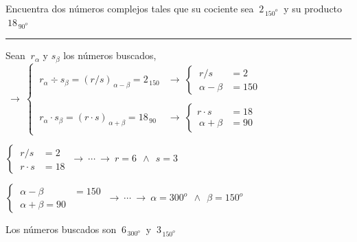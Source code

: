 \begin{miejercicio}

Encuentra dos números complejos tales que su cociente sea $\ 2_{\, 150^o} \ $ y su producto $\ 18_{\, 90^o}$

\rule{250pt}{0.5pt}

\vspace{2mm} Sean $\ r_\alpha$ y $s_\beta$ los números buscados,
$\ \to \ \begin{cases}
\ r_\alpha \div s_\beta=(r/s)_{\, \alpha-\beta}= 2_{\, 150}  
&\to \ \begin{cases} \ r/s&=2 \\ \ \alpha-\beta&=150   \end{cases}
\\ \\
\ r_\alpha \cdot s_\beta=(r\cdot s)_{\, \alpha+\beta}=18_{\, 90}	
&\to \ \begin{cases}  r\cdot s &=18 \\ \ \alpha+\beta&=90  \end{cases}
\end{cases}$

\vspace{2mm} $\begin{cases} \ r/s&=2 \\ \ r\cdot s&=18 \end{cases} \ \to \ \cdots \ \to \ r=6\ \ \wedge \ \ s=3 $

\vspace{2mm} $\begin{cases} \ \alpha-\beta&=150 \\ \ \alpha+\beta=90 \end{cases} \ \to \ \cdots \ \to \ \alpha=300^o \ \ \wedge \ \ \beta=150^o$

\vspace{2mm} Los números buscados son $\ 6_{\, 300^o} \ $ y $ \ 3_{\, 150^o}$



\end{miejercicio}

